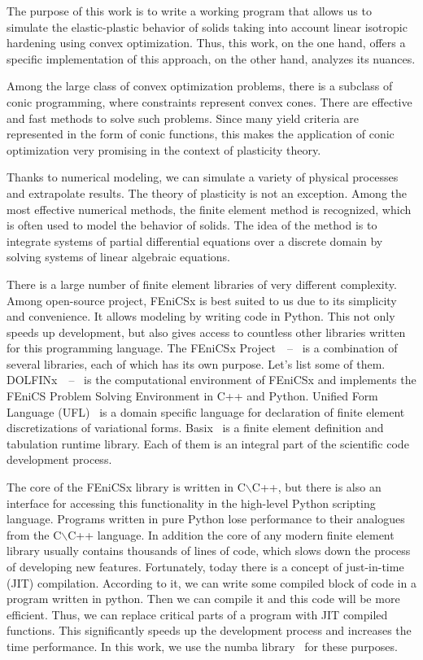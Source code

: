\documentclass[12pt]{article}
\begin{document}
The purpose of this work is to write a working program that allows us to simulate the elastic-plastic behavior of solids taking into account linear isotropic hardening using convex optimization. Thus, this work, on the one hand, offers a specific implementation of this approach, on the other hand, analyzes its nuances.

Among the large class of convex optimization problems, there is a subclass of conic programming, where constraints represent convex cones. There are effective and fast methods to solve such problems. Since many yield criteria are represented in the form of conic functions, this makes the application of conic optimization very promising in the context of plasticity theory.

Thanks to numerical modeling, we can simulate a variety of physical processes and extrapolate results. The theory of plasticity is not an exception. Among the most effective numerical methods, the finite element method is recognized, which is often used to model the behavior of solids. The idea of the method is to integrate systems of partial differential equations over a discrete domain by solving systems of linear algebraic equations. 

There is a large number of finite element libraries of very different complexity. Among open-source project, FEniCSx is best suited to us due to its simplicity and convenience. It allows modeling by writing code in Python. This not only speeds up development, but also gives access to countless other libraries written for this programming language. The FEniCSx Project~\parencite{FEniCS2015}~--~\parencite{LoggEtal2012} is a combination of several libraries, each of which has its own purpose. Let's list some of them. DOLFINx~\parencite{LoggWells2010}~--~\parencite{LoggEtal_10_2012} is the computational environment of FEniCSx and implements the FEniCS Problem Solving Environment in C++ and Python. Unified Form Language (UFL)~\parencite{UFL2014} is a domain specific language for declaration of finite element discretizations of variational forms. Basix~\parencite{BasixJoss} is a finite element definition and tabulation runtime library. Each of them is an integral part of the scientific code development process.

The core of the FEniCSx library is written in C$\backslash$C++, but there is also an interface for accessing this functionality in the high-level Python scripting language. Programs written in pure Python lose performance to their analogues from the C$\backslash$C++ language. In addition the core of any modern finite element library usually contains thousands of lines of code, which slows down the process of developing new features. Fortunately, today there is a concept of just-in-time (JIT) compilation. According to it, we can write some compiled block of code in a program written in python. Then we can compile it and this code will be more efficient. Thus, we can replace critical parts of a program with JIT compiled functions. This significantly speeds up the development process and increases the time performance. In this work, we use the numba library~\parencite{Numba2015} for these purposes. 
\end{document}
